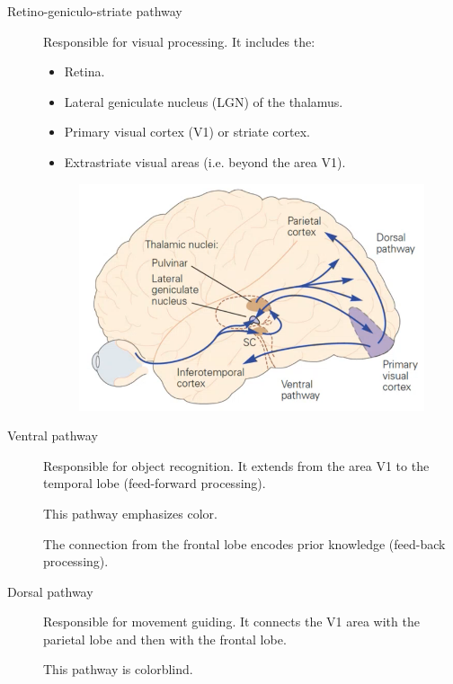 \begin{description}
    \item[Retino-geniculo-striate pathway] 
        Responsible for visual processing.
        It includes the:
        \begin{itemize}
            \item Retina.
            \item Lateral geniculate nucleus (LGN) of the thalamus.
            \item Primary visual cortex (V1) or striate cortex.
            \item Extrastriate visual areas (i.e. beyond the area V1).
        \end{itemize}

        \begin{figure}[H]
            \centering
            \includegraphics[width=0.35\linewidth]{./img/vision_pathway.png}
        \end{figure}

        
    \item[Ventral pathway] 
        Responsible for object recognition.
        It extends from the area V1 to the temporal lobe (feed-forward processing).

        \begin{remark}
            This pathway emphasizes color.
        \end{remark}

        \begin{remark}
            The connection from the frontal lobe encodes prior knowledge (feed-back processing).
        \end{remark}

    \item[Dorsal pathway] 
        Responsible for movement guiding.
        It connects the V1 area with the parietal lobe and then with the frontal lobe.

        \begin{remark}
            This pathway is colorblind.
        \end{remark}
\end{description}

